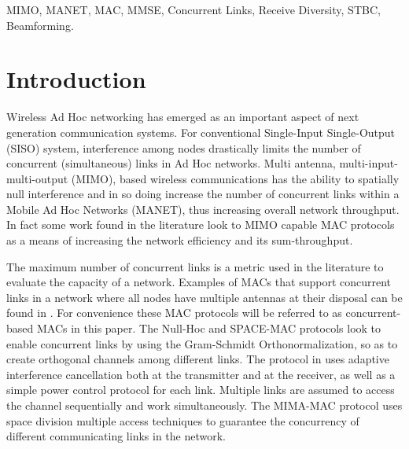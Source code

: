 \documentclass[draftcls,onecolumn,peerview,12pt]{IEEEtran}
\begin{document}
\begin{keywords}
MIMO, MANET, MAC, MMSE, Concurrent Links, Receive Diversity, STBC,
Beamforming.
\end{keywords}

\IEEEpeerreviewmaketitle


\section{Introduction}
Wireless Ad Hoc networking has emerged as an important aspect of
next generation communication systems. For conventional Single-Input
Single-Output (SISO) system, interference among nodes drastically
limits the number of concurrent (simultaneous) links in Ad Hoc
networks. Multi antenna, multi-input-multi-output (MIMO), based
wireless communications has the ability to spatially null
interference and in so doing increase the number of concurrent links
within a Mobile Ad Hoc Networks (MANET), thus increasing overall
network throughput. In fact some work found in the literature
\cite{1_Fair_MAC, 2_nullhoc, 3_SPACEMAC2005,
4_Adaptive_Interference_Cancellation2005, 5_cross_layer,
6_CrossIssue06} look to MIMO capable MAC protocols as a means of
increasing the network efficiency and its sum-throughput.

The maximum number of concurrent links is a metric used in the
literature \cite{1_Fair_MAC, 8_Mesh, 9_interference_temp} to
evaluate the capacity of a network. Examples of MACs that support
concurrent links in a network where all nodes have multiple antennas
at their disposal can be found in \cite{1_Fair_MAC, 2_nullhoc,
3_SPACEMAC2005, 4_Adaptive_Interference_Cancellation2005,
5_cross_layer, 8_Mesh}. For convenience these MAC protocols will be
referred to as concurrent-based MACs in this paper. The Null-Hoc
\cite{2_nullhoc} and SPACE-MAC \cite{3_SPACEMAC2005} protocols look
to enable concurrent links by using the Gram-Schmidt
Orthonormalization, so as to create orthogonal channels among
different links. The protocol in
\cite{4_Adaptive_Interference_Cancellation2005} uses adaptive
interference cancellation both at the transmitter and at the
receiver, as well as a simple power control protocol for each link.
Multiple links are assumed to access the channel sequentially and
work simultaneously. The MIMA-MAC protocol \cite{5_cross_layer} uses
space division multiple access techniques to guarantee the
concurrency of different communicating links in the network.
\end{document}
